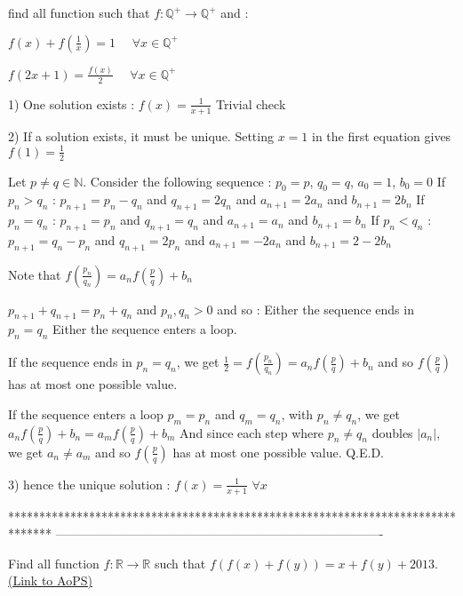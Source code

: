 \begin{solution}
	\begin{tcolorbox}find all function such that $f:\mathbb{Q}^{+}\rightarrow \mathbb{Q}^{+}$ and :

$f(x)+f(\frac{1}{x})=1 \: \: \: \: \: \: \forall x\in \mathbb{Q}^{+} $ 

$f(2x+1)=\frac{f(x)}{2}  \: \: \: \: \: \: \forall x\in \mathbb{Q}^{+}$\end{tcolorbox}
1) One solution exists : $f(x)=\frac 1{x+1}$
Trivial check

2) If a solution exists, it must be unique.
Setting $x=1$ in the first equation gives $f(1)=\frac 12$

Let $p\ne q\in\mathbb N$. Consider the following sequence :
$p_0=p$, $q_0=q$, $a_0=1$, $b_0=0$
If $p_n>q_n$ : $p_{n+1}=p_n-q_n$ and $q_{n+1}=2q_n$ and $a_{n+1}=2a_n$ and $b_{n+1}=2b_n$
If $p_n=q_n$ : $p_{n+1}=p_n$ and $q_{n+1}=q_n$ and $a_{n+1}=a_n$ and $b_{n+1}=b_n$
If $p_n<q_n$ : $p_{n+1}=q_n-p_n$ and $q_{n+1}=2p_n$ and $a_{n+1}=-2a_n$ and $b_{n+1}=2-2b_n$

Note that $f(\frac{p_n}{q_n})=a_nf(\frac pq)+b_n$

$p_{n+1}+q_{n+1}=p_n+q_n$ and $p_n,q_n>0$ and so :
Either the sequence ends in $p_n=q_n$
Either the sequence enters a loop.

If the sequence ends in $p_n=q_n$, we get $\frac 12=f(\frac{p_n}{q_n})=a_nf(\frac pq)+b_n$ and so $f(\frac pq)$ has at most one possible value.

If the sequence enters a loop $p_{m}=p_n$ and $q_m=q_n$, with $p_n\ne q_n$, we get $a_nf(\frac pq)+b_n=a_mf(\frac pq)+b_m$
And since each step where $p_n\ne q_n$ doubles $|a_n|$, we get $a_n\ne a_m$ and so $f(\frac pq)$ has at most one possible value.
Q.E.D.

3) hence the unique solution : $\boxed{f(x)=\frac 1{x+1}}$ $\forall x$
\end{solution}
*******************************************************************************
-------------------------------------------------------------------------------

\begin{problem}
	Find all function $f: \mathbb{R}\to\mathbb{R}$ such that $f(f(x)+f(y))=x+f(y)+2013$.
	\flushright \href{https://artofproblemsolving.com/community/c6h563060}{(Link to AoPS)}
\end{problem}



